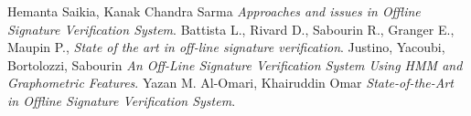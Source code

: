 \label{4.3}
\newpage

\printglossaries
{}
\label{5.0}

\newpage
\begin{thebibliography}{1}
 Hemanta Saikia, Kanak Chandra Sarma {\em Approaches and issues in Offline Signature Verification System}.
 Battista L., Rivard D., Sabourin R., Granger E., Maupin P., {\em State of the art in off-line signature verification}.
 Justino, Yacoubi, Bortolozzi, Sabourin {\em An Off-Line Signature Verification System Using HMM and Graphometric Features}.
 Yazan M. Al-Omari, Khairuddin Omar {\em State-of-the-Art in Offline Signature Verification System}.
\end{thebibliography}
\label{6.0}

\newpage





